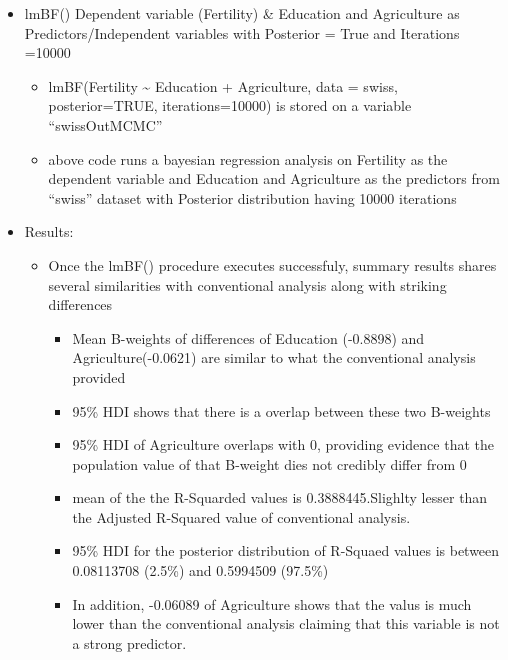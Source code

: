 \documentclass[]{article}
\providecommand{\tightlist}{%
  \setlength{\itemsep}{0pt}\setlength{\parskip}{0pt}}
\begin{document}
\begin{itemize}
\tightlist
\item
  lmBF() \textbar{} Dependent variable (Fertility) \& Education and
  Agriculture as Predictors/Independent variables with Posterior = True
  and Iterations =10000

  \begin{itemize}
  \tightlist
  \item
    lmBF(Fertility \textasciitilde{} Education + Agriculture, data =
    swiss, posterior=TRUE, iterations=10000) is stored on a variable
    ``swissOutMCMC''
  \item
    above code runs a bayesian regression analysis on Fertility as the
    dependent variable and Education and Agriculture as the predictors
    from ``swiss'' dataset with Posterior distribution having 10000
    iterations
  \end{itemize}
\item
  Results:

  \begin{itemize}
  \tightlist
  \item
    Once the lmBF() procedure executes successfuly, summary results
    shares several similarities with conventional analysis along with
    striking differences

    \begin{itemize}
    \tightlist
    \item
      Mean B-weights of differences of Education (-0.8898) and
      Agriculture(-0.0621) are similar to what the conventional analysis
      provided
    \item
      95\% HDI shows that there is a overlap between these two B-weights
    \item
      95\% HDI of Agriculture overlaps with 0, providing evidence that
      the population value of that B-weight dies not credibly differ
      from 0
    \item
      mean of the the R-Squarded values is 0.3888445.Slighlty lesser
      than the Adjusted R-Squared value of conventional analysis.
    \item
      95\% HDI for the posterior distribution of R-Squaed values is
      between 0.08113708 (2.5\%) and 0.5994509 (97.5\%)
    \item
      In addition, -0.06089 of Agriculture shows that the valus is much
      lower than the conventional analysis claiming that this variable
      is not a strong predictor.
    \end{itemize}
  \end{itemize}
\end{itemize}
\end{document}
